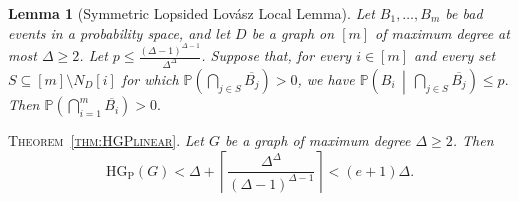 \documentclass[a4paper,11pt]{amsproc}
\theoremstyle{plain}
\newtheorem{Lemma} [Theorem] {Lemma}
\theoremstyle{definition}
\newcommand{\HGP}{\mathrm{HG_{P}}}
\newcommand{\Prob}{\mathbb{P}}
\begin{document}
\begin{Lemma}[Symmetric Lopsided Lov\'{a}sz Local Lemma]
\label{lem:LLLL}
Let $B_1,\dots,B_m$ be bad events in a probability space, and let $D$ be a
graph on $[m]$ of maximum degree at most $\Delta\ge 2$. Let $p\le \frac{(\Delta-1)^{\Delta-1}}{\Delta^\Delta}$. Suppose that, for every
$i\in[m]$ and every set
$S\subseteq [m]\setminus N_D[i]$
for which $\Prob(\bigcap_{j\in S}\overline{B_j})>0$, we have
$\Prob\left( B_i\,\middle|\,\bigcap_{j\in S}\overline{B_j} \right)\le p.$
Then
$\Prob\!\left(\bigcap_{i=1}^m\overline{B_i}\right)>0.$
\end{Lemma}

{\scshape Theorem~\ref{thm:HGPlinear}.}
{\it Let $G$ be a graph of maximum degree $\Delta\ge 2$.  Then}
$$ \HGP(G) < \Delta+ \left\lceil \frac{\Delta^\Delta}{(\Delta-1)^{\Delta-1}}\right\rceil  <(e+1)\Delta.$$
\end{document}
